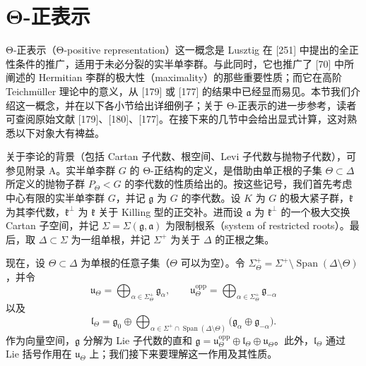 
\section{Θ-正表示}

Θ-正表示（Θ-positive representation）这一概念是 Lusztig 在 [251] 中提出的全正性条件的推广，适用于未必分裂的实半单李群。与此同时，它也推广了 [70] 中所阐述的 Hermitian 李群的极大性（maximality）的那些重要性质；而它在高阶 Teichmüller 理论中的意义，从 [179] 或 [177] 的结果中已经显而易见。本节我们介绍这一概念，并在以下各小节给出详细例子；关于 Θ-正表示的进一步参考，读者可查阅原始文献 [179]、[180]、[177]。在接下来的几节中会给出显式计算，这对熟悉以下对象大有裨益。

关于李论的背景（包括 Cartan 子代数、根空间、Levi 子代数与抛物子代数），可参见附录 A。实半单李群 $G$ 的 Θ-正结构的定义，是借助由单正根的子集 $\Theta\subset\Delta$ 所定义的抛物子群 $P_\Theta<G$ 的李代数的性质给出的。按这些记号，我们首先考虑中心有限的实半单李群 $G$，并记 $\mathfrak{g}$ 为 $G$ 的李代数。设 $K$ 为 $G$ 的极大紧子群，$\mathfrak{k}$ 为其李代数，$\mathfrak{k}^\perp$ 为 $\mathfrak{k}$ 关于 Killing 型的正交补。进而设 $\mathfrak{a}$ 为 $\mathfrak{k}^\perp$ 的一个极大交换 Cartan 子空间，并记 $\Sigma=\Sigma(\mathfrak{g},\mathfrak{a})$ 为限制根系（system of restricted roots）。最后，取 $\Delta\subset\Sigma$ 为一组单根，并记 $\Sigma^+$ 为关于 $\Delta$ 的正根之集。

现在，设 $\Theta\subset\Delta$ 为单根的任意子集（$\Theta$ 可以为空）。令 $\Sigma_\Theta^+=\Sigma^+\setminus\operatorname{Span}(\Delta\setminus\Theta)$，并令
\[
\mathfrak{u}_\Theta=\bigoplus_{\alpha\in\Sigma_\Theta^+}\mathfrak{g}_\alpha,
\qquad
\mathfrak{u}_\Theta^{\mathrm{opp}}=\bigoplus_{\alpha\in\Sigma_\Theta^+}\mathfrak{g}_{-\alpha}
\]
以及
\[
\mathfrak{l}_\Theta=\mathfrak{g}_0\oplus\bigoplus_{\alpha\in\Sigma^+\cap\operatorname{Span}(\Delta\setminus\Theta)}\bigl(\mathfrak{g}_\alpha\oplus\mathfrak{g}_{-\alpha}\bigr).
\]
作为向量空间，$\mathfrak{g}$ 分解为 Lie 子代数的直和 $\mathfrak{g}=\mathfrak{u}_\Theta^{\mathrm{opp}}\oplus\mathfrak{l}_\Theta\oplus\mathfrak{u}_\Theta$。此外，$\mathfrak{l}_\Theta$ 通过 Lie 括号作用在 $\mathfrak{u}_\Theta$ 上；我们接下来要理解这一作用及其性质。


